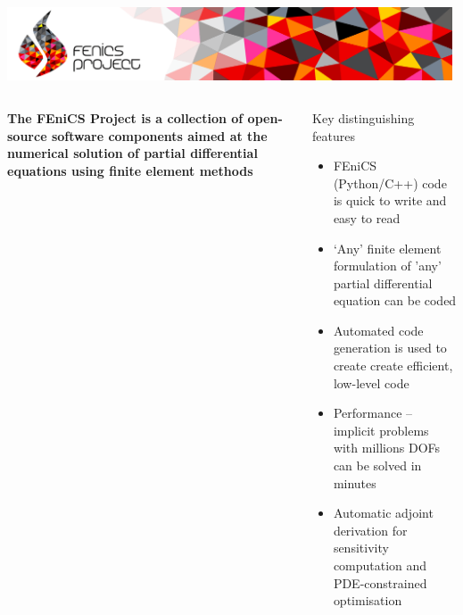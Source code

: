\begin{frame}
\medskip
\includegraphics[width=0.99\textwidth]{png/fenics_banner.png}
\begin{columns}[c]
\begin{column}{0.4\textwidth}
\bf{The FEniCS Project is a collection of open-source software
  components aimed at the numerical solution of partial differential
  equations using finite element methods}
\end{column}
\begin{column}{0.7\textwidth}
  \begin{block}{Key distinguishing features}
  \begin{itemize}
  \item
    FEniCS (Python/C++) code is quick to write and easy to read
  \item
    `Any' finite element formulation of 'any' partial differential
    equation can be coded
  \item
    Automated code generation is used to create 
    create efficient, low-level code
  \item
    Performance -- implicit problems with millions DOFs
    can be solved in minutes
  \item
    Automatic adjoint derivation for sensitivity computation 
    and PDE-constrained optimisation
  \end{itemize}
  \end{block}
\end{column}
\end{columns}
  \begin{center}
  \end{center}
\end{frame}
